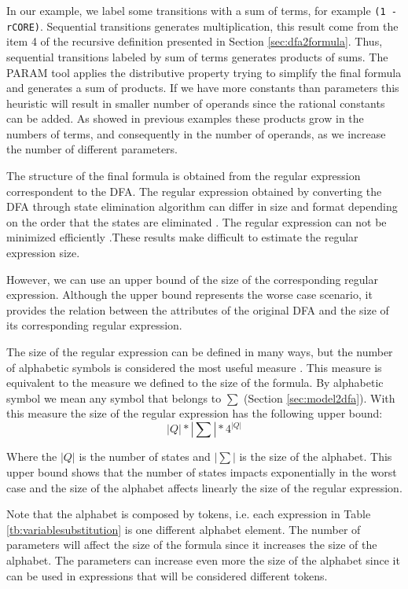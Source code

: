\documentclass[conference]{IEEEtran}
\begin{document}
	In our example, we label some transitions with a sum of terms, for example
	\texttt{(1 - rCORE)}. Sequential transitions generates multiplication,
	this result come from the item 4 of the recursive definition presented
	in Section \ref{sec:dfa2formula}. Thus, sequential transitions labeled by sum 
	of terms generates products of sums. The PARAM tool applies the distributive 
	property trying to simplify the final formula and generates a sum of products.
	If we have more constants than parameters this heuristic will result
	in smaller number of operands since the rational constants can be added.	
	As showed in previous
	examples these products grow in the numbers of terms, and consequently
	in the number of operands, as we increase the number of different parameters.
						
	
	The structure of the final formula is obtained from the regular expression
	correspondent to the DFA. The regular expression obtained by
	converting the DFA through state elimination algorithm can differ
	in size and format depending on the order that the states are eliminated \cite{ahn}.	
	The regular expression can not be minimized efficiently \cite{gramlich}.These
	results make difficult to estimate the regular expression size.
		
	However, we can use an upper bound of the size of the corresponding 
	regular expression. Although the upper bound represents the worse
	case scenario, it provides the relation between the attributes of the
	original DFA and the size of its corresponding regular expression.		
	
	The size of the regular expression can be defined in many ways, but
	the number of alphabetic symbols is considered the most useful measure \cite{ellulre}.
	This measure is equivalent to the measure we defined to the size of the formula.
	By alphabetic symbol we mean any symbol that belongs to $\sum$ (Section \ref{sec:model2dfa}).
	With this measure the size of the regular expression has the following upper bound:	
	\begin{equation}
		|Q|*|\sum|*4^{|Q|}
	\end{equation}

	Where the $|Q|$ is the number of states and $|\sum|$ is the size of the alphabet.
	This upper bound shows that the number of states impacts exponentially in the worst
	case and the size of the alphabet affects linearly the size of the regular expression.		
	
	Note that the alphabet is composed by tokens, i.e. each expression in Table \ref{tb:variablesubstitution}
	is one different alphabet element. The number of parameters will affect
	the size of the formula since it increases the size of the alphabet. The 
	parameters can increase even more the size of the alphabet since it can be used
	in expressions that will be considered different tokens.	
		
\end{document}
